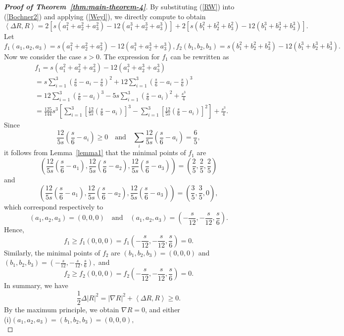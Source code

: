 \documentclass[11pt, reqno]{amsart}
\numberwithin{equation}{section}
\theoremstyle{definition}
\begin{document}
\begin{proof}[\textbf{Proof of Theorem~\ref{thm:main-theorem-4}}]
      By substituting (\ref{RW}) into (\ref{Bochner2}) and applying (\ref{Weyl}), we directly compute to obtain
      \begin{equation}\label{Bochner3}
		\left\langle \Delta R,R \right\rangle =2[s(a_{1}^2+a_{2}^2+a_{3}^2)-12(a_{1}^3+a_{2}^3+a_{3}^3)]+2[s(b_{1}^2+b_{2}^2+b_{3}^2)-12(b_{1}^3+b_{2}^3+b_{3}^3)] .	\end{equation}
      Let
		$$f_1(a_1,a_2,a_3)=s(a_{1}^2+a_{2}^2+a_{3}^2)-12(a_{1}^3+a_{2}^3+a_{3}^3), f_2(b_1,b_2,b_3)=s(b_{1}^2+b_{2}^2+b_{3}^2)-12(b_{1}^3+b_{2}^3+b_{3}^3).$$ 		
		Now we consider the case $s>0$. The expression for $f_1$ can be rewritten as
		\begin{align*}
			& f_1=s(a_{1}^2+a_{2}^2+a_{3}^2)-12(a_{1}^3+a_{2}^3+a_{3}^3) \\ 
			& =s\sum\limits_{i=1}^{3}{(\frac{s}{6}-a_i-\frac{s}{6})^2}+12\sum\limits_{i=1}^{3}{(\frac{s}{6}-a_i-\frac{s}{6})^3} \\ 
			& =12\sum\limits_{i=1}^{3}{(\frac{s}{6}-a_i)^3}-5s\sum\limits_{i=1}^{3}{(\frac{s}{6}-a_i)^2}+\frac{s^3}{4} \\ 
			& =\frac{125}{144}s^3\left[ \sum\limits_{i=1}^{3}{[\frac{12}{5s}(\frac{s}{6}-a_i)]^3}-\sum\limits_{i=1}^{3}{[\frac{12}{5s}(\frac{s}{6}-a_i)]^2} \right]+\frac{s^3}{4}.
		\end{align*}
		Since 
		\[\frac{12}{5s}(\frac{s}{6}-a_i)\ge 0\quad\text{and}\quad \sum\limits_{i}{\frac{12}{5s}(\frac{s}{6}-a_i)}=\frac{6}{5},\]
		it follows from Lemma~\ref{lemma1} that the minimal points of $f_1$ are 
		$$(\frac{12}{5s}(\frac{s}{6}-a_1),\frac{12}{5s}(\frac{s}{6}-a_2),\frac{12}{5s}(\frac{s}{6}-a_3))=(\frac{2}{5},\frac{2}{5},\frac{2}{5})$$
		and  
		$$(\frac{12}{5s}(\frac{s}{6}-a_1),\frac{12}{5s}(\frac{s}{6}-a_2),\frac{12}{5s}(\frac{s}{6}-a_3))=(\frac{3}{5},\frac{3}{5},0),$$
		which correspond respectively to $$(a_1,a_2,a_3)=(0,0,0) \quad\text{and}\quad (a_1,a_2,a_3)=(-\frac{s}{12},-\frac{s}{12},\frac{s}{6}).$$
		Hence,
		$$f_1\ge f_1(0,0,0)=f_1(-\frac{s}{12},-\frac{s}{12},\frac{s}{6})=0.$$
Similarly, the minimal points of $f_2$ are $(b_1,b_2,b_3)=(0,0,0)$ and $(b_1,b_2,b_3)=(-\frac{s}{12},-\frac{s}{12},\frac{s}{6}),$  and
$$f_2\ge f_2(0,0,0)=f_2(-\frac{s}{12},-\frac{s}{12},\frac{s}{6})=0.$$
		In summary, we have
		$$\frac{1}{2}\Delta {{\left| R \right|}^{2}}={{\left| \nabla R \right|}^{2}}+\left\langle \Delta R,R \right\rangle \ge 0.$$
		By the maximum principle, we obtain $\nabla R=0$, and either\\ 
		(i)$(a_1,a_2,a_3)=(b_1,b_2,b_3)=(0,0,0),$ \\

\end{proof}
\end{document}
